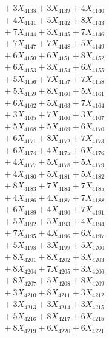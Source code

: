 \documentclass[a4paper,10pt]{article}
\begin{document}
{\begin{align}
&\;  + 3 X_{4138} + 3 X_{4139} + 4 X_{4140} \\[0.3ex]
&\;  + 4 X_{4141} + 5 X_{4142} + 8 X_{4143} \\[0.3ex]
&\;  + 7 X_{4144} + 3 X_{4145} + 7 X_{4146} \\[0.3ex]
&\;  + 7 X_{4147} + 7 X_{4148} + 5 X_{4149} \\[0.5ex]\allowbreak
&\;  + 6 X_{4150} + 6 X_{4151} + 8 X_{4152} \\[0.3ex]
&\;  + 6 X_{4153} + 3 X_{4154} + 6 X_{4155} \\[0.3ex]
&\;  + 5 X_{4156} + 7 X_{4157} + 7 X_{4158} \\[0.3ex]
&\;  + 5 X_{4159} + 8 X_{4160} + 5 X_{4161} \\[0.3ex]
&\;  + 6 X_{4162} + 5 X_{4163} + 7 X_{4164} \\[0.3ex]
&\;  + 3 X_{4165} + 7 X_{4166} + 3 X_{4167} \\[0.3ex]
&\;  + 5 X_{4168} + 5 X_{4169} + 6 X_{4170} \\[0.3ex]
&\;  + 6 X_{4171} + 8 X_{4172} + 7 X_{4173} \\[0.3ex]
&\;  + 6 X_{4174} + 4 X_{4175} + 6 X_{4176} \\[0.3ex]
&\;  + 4 X_{4177} + 5 X_{4178} + 5 X_{4179} \\[0.5ex]\allowbreak
&\;  + 4 X_{4180} + 5 X_{4181} + 5 X_{4182} \\[0.3ex]
&\;  + 8 X_{4183} + 7 X_{4184} + 7 X_{4185} \\[0.3ex]
&\;  + 4 X_{4186} + 4 X_{4187} + 7 X_{4188} \\[0.3ex]
&\;  + 6 X_{4189} + 4 X_{4190} + 7 X_{4191} \\[0.3ex]
&\;  + 5 X_{4192} + 5 X_{4193} + 4 X_{4194} \\[0.3ex]
&\;  + 7 X_{4195} + 4 X_{4196} + 6 X_{4197} \\[0.3ex]
&\;  + 5 X_{4198} + 3 X_{4199} + 5 X_{4200} \\[0.3ex]
&\;  + 8 X_{4201} + 8 X_{4202} + 3 X_{4203} \\[0.3ex]
&\;  + 8 X_{4204} + 7 X_{4205} + 3 X_{4206} \\[0.3ex]
&\;  + 8 X_{4207} + 5 X_{4208} + 8 X_{4209} \\[0.5ex]\allowbreak
&\;  + 3 X_{4210} + 8 X_{4211} + 3 X_{4212} \\[0.3ex]
&\;  + 3 X_{4213} + 3 X_{4214} + 3 X_{4215} \\[0.3ex]
&\;  + 5 X_{4216} + 8 X_{4217} + 6 X_{4218} \\[0.3ex]
&\;  + 8 X_{4219} + 6 X_{4220} + 6 X_{4221} \\[0.3ex]

\end{align}}
\end{document}
